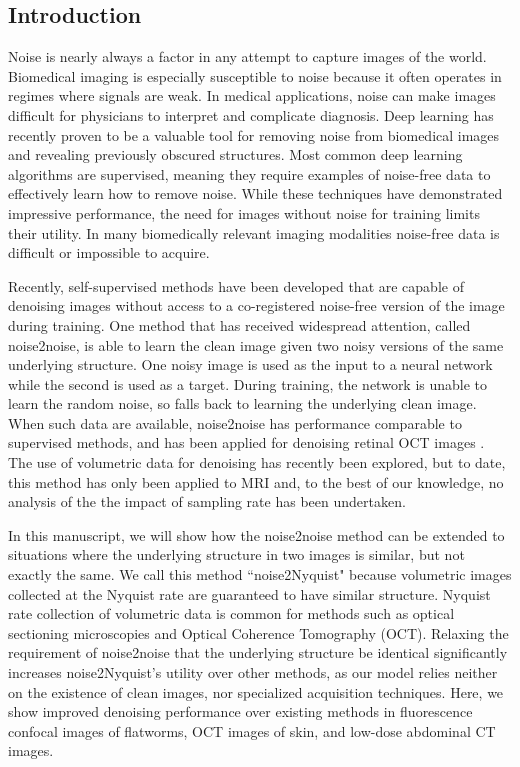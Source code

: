 \documentclass[12pt]{spieman}
\begin{document}
\begin{spacing}{2}   %


\section{Introduction}
Noise is nearly always a factor in any attempt to capture images of the world. Biomedical imaging is especially susceptible to noise because it often operates in regimes where signals are weak. In medical applications, noise can make images difficult for physicians to interpret and complicate diagnosis. Deep learning has recently proven to be a valuable tool for removing noise from biomedical images and revealing previously obscured structures\cite{Kaur2017}. Most common deep learning algorithms are supervised, meaning they require examples of noise-free data to effectively learn how to remove noise. While these techniques have demonstrated impressive performance, the need for images without noise for training limits their utility. In many biomedically relevant imaging modalities noise-free data is difficult or impossible to acquire.

Recently, self-supervised methods have been developed that are capable of denoising images without access to a co-registered noise-free version of the image during training. One method that has received widespread attention, called noise2noise, is able to learn the clean image given two noisy versions of the same underlying structure\cite{Lehtinen2018a}. One noisy image is used as the input to a neural network while the second is used as a target. During training, the network is unable to learn the random noise, so falls back to learning the underlying clean image. When such data are available, noise2noise has performance comparable to supervised methods, and has been applied for denoising retinal OCT images \cite{Huang2021,Huang2021a,Mao2019,Qiu2021}. The use of volumetric data for denoising has recently been explored\cite{Papkov2021}, but to date, this method has only been applied to MRI and, to the best of our knowledge, no analysis of the the impact of sampling rate has been undertaken.

In this manuscript, we will show how the noise2noise method can be extended to situations where the underlying structure in two images is similar, but not exactly the same. We call this method ``noise2Nyquist" because volumetric images collected at the Nyquist rate are guaranteed to have similar structure. Nyquist rate collection of volumetric data is common for methods such as optical sectioning microscopies and Optical Coherence Tomography (OCT). Relaxing the requirement of noise2noise that the underlying structure be identical significantly increases noise2Nyquist's utility over other methods, as our model relies neither on the existence of clean images, nor specialized acquisition techniques. Here, we show improved denoising performance over existing methods in fluorescence confocal images of flatworms, OCT images of skin, and low-dose abdominal CT images. 


\end{spacing}
\end{document}
